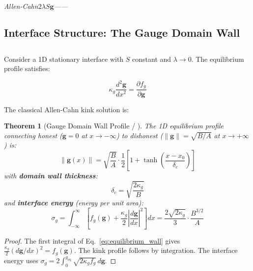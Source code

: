 \documentclass[12pt,a4paper]{article}
\theoremstyle{plain}
\newtheorem{theorem}{ Theorem}[section]
\theoremstyle{definition}
\newcommand{\gf}{\mathbf{g}}          %
\newcommand{\Sf}{S}                   %
\newcommand{\deltac}{\delta_c}        %
\newcommand{\cn}[1]{\textcolor{scxgray}{\textit{#1}}}
\begin{document}
\bigskip
\noindent
\cn{Allen-Cahn$2\lambda\Sf\gf$——}

\subsection{Interface Structure: The Gauge Domain Wall}
\subsection*{}

Consider a 1D stationary interface with $\Sf$ constant and $\lambda\to0$.
The equilibrium profile satisfies:

\begin{equation}
    \kappa_g \frac{d^2 \gf}{dx^2} = \frac{\partial f_g}{\partial \gf}
    \label{eq:equilibrium_wall}
\end{equation}

The classical Allen-Cahn kink solution is:

\begin{theorem}[Gauge Domain Wall Profile / ]
\label{thm:kink}
The 1D equilibrium profile connecting honest ($\gf=0$ at $x\to-\infty$) to
dishonest ($\|\gf\|=\sqrt{B/A}$ at $x\to+\infty$) is:
\begin{equation}
    \|\gf(x)\| = \sqrt{\frac{B}{A}} \cdot
    \frac{1}{2}\left[1 + \tanh\left(\frac{x - x_0}{\deltac}\right)\right]
    \label{eq:kink_profile}
\end{equation}
with \textbf{domain wall thickness}:
\begin{equation}
    \deltac = \sqrt{\frac{2\kappa_g}{B}}
    \label{eq:wall_thickness}
\end{equation}
and \textbf{interface energy} (energy per unit area):
\begin{equation}
    \sigma_g = \int_{-\infty}^{\infty} \left[f_g(\gf) + \frac{\kappa_g}{2}\left|\frac{d\gf}{dx}\right|^2\right]dx
    = \frac{2\sqrt{2\kappa_g}}{3}\cdot\frac{B^{3/2}}{A}
    \label{eq:interface_energy}
\end{equation}
\end{theorem}

\begin{proof}
The first integral of Eq.~\eqref{eq:equilibrium_wall} gives
$\frac{\kappa_g}{2}(d\gf/dx)^2 = f_g(\gf)$.
The kink profile follows by integration. The interface energy uses
$\sigma_g = 2\int_0^{g_{\text{eq}}}\sqrt{2\kappa_g f_g}\,d\gf$.
\end{proof}
\end{document}
